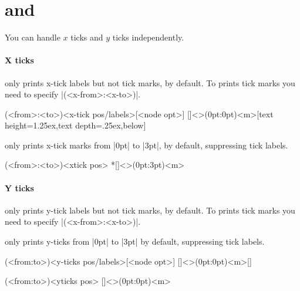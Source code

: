 \section{\protect\cmd{\tzticksx(*)} and \protect\cmd{\tzticksy(*)}}
\label{s:tzticksx}

You can handle $x$ ticks and $y$ ticks independently.

\paragraph{X ticks}

\icmd{\tzticksx} only prints x-tick labels but not tick marks, by default.
To prints tick marks you need to specify |(<x-from>:<x-to>)|.

\begin{tzdef}
(<from>:<to>){<x-tick pos/labels>}[<node opt>]
  []<>(0pt:0pt){<m>}[text height=1.25ex,text depth=.25ex,below]
\end{tzdef}


\icmd{\tzticksx*} only prints x-tick marks from |0pt| to |3pt|, by default, suppressing tick labels.

\begin{tzdef}
(<from>:<to>){<xtick pos>}
 *[]<>(0pt:3pt){<m>}
\end{tzdef}


\paragraph{Y ticks}

\icmd{\tzticksy} only prints y-tick labels but not tick marks, by default.
To prints tick marks you need to specify |(<x-from>:<x-to>)|.

\icmd{\tzticksy*} only prints y-ticks from |0pt| to |3pt| by default, suppressing tick labels.

\begin{tzdef}
(<from:to>){<y-ticks pos/labels>}[<node opt>]
  []<>(0pt:0pt){<m>}[]
\end{tzdef}

\begin{tzdef}
(<from:to>){<yticks pos>}
  []<>(0pt:0pt){<m>}
\end{tzdef}


